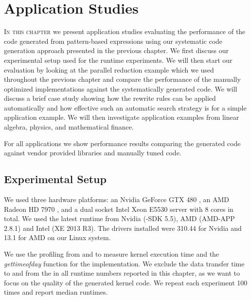 
\chapter{Application Studies}
\label{ch:sixth} %
\label{chapter:codeGeneration-evaluation}
%
%

\lettrine[lines=3, loversize=0.1]{I}{n this chapter} we present application studies evaluating the performance of the \OpenCL code generated from pattern-based expressions using our systematic code generation approach presented in the previous chapter.
We first discuss our experimental setup used for the runtime experiments.
We will then start our evaluation by looking at the parallel reduction example which we used throughout the previous chapter and compare the performance of the manually optimized \OpenCL implementations against the systematically generated code.
We will discuss a brief case study showing how the rewrite rules can be applied automatically and how effective such an automatic search strategy is for a simple application example.
We will then investigate application examples from linear algebra, physics, and mathematical finance.

For all applications we show performance results comparing the generated \OpenCL code against vendor provided libraries and manually tuned \OpenCL code.

\section{Experimental Setup}
We used three hardware platforms: an Nvidia GeForce GTX 480 \GPU, an AMD Radeon HD 7970 \GPU, and a dual socket Intel Xeon E5530 server with 8 cores in total.
We used the latest \OpenCL runtime from Nvidia (\CUDA-SDK 5.5), AMD (AMD-APP 2.8.1) and Intel (XE 2013 R3).
The \GPU drivers installed were 310.44 for Nvidia and 13.1 for AMD on our Linux system.

We use the profiling \APIs from \OpenCL and \CUDA to measure kernel execution time and the \textit{gettimeofday} function for the \CPU implementation.
We exclude the data transfer time to and from the \GPU in all runtime numbers reported in this chapter, as we want to focus on the quality of the generated \OpenCL kernel code.
We repeat each experiment 100 times and report median runtimes.




